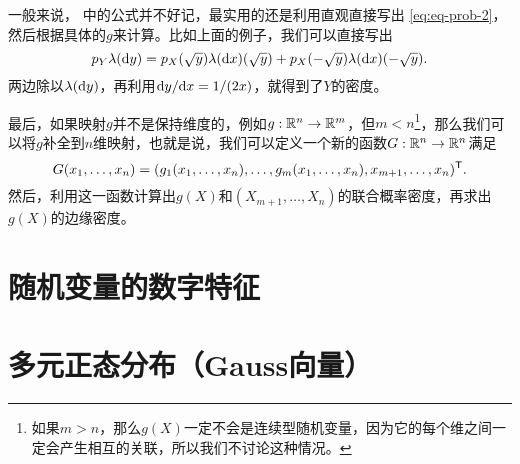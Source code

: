 一般来说， 中的公式并不好记，最实用的还是利用直观直接写出 \eqref{eq:eq-prob-2}，然后根据具体的$g$来计算。比如上面的例子，我们可以直接写出
\[p_Y\lambda(\mathrm{d} y)=p_X(\sqrt{y})\lambda(\mathrm{d} x)(\sqrt{y})+p_X(-\sqrt{y})\lambda(\mathrm{d} x)(-\sqrt{y}).\]
两边除以$\lambda(\mathrm{d} y)$，再利用$\mathrm{d} y/\mathrm{d} x=1/(2x)$，就得到了$Y$的密度。

最后，如果映射$g$并不是保持维度的，例如$g:\mathbb{R}^n\to\mathbb{R}^m$，但$m<n$\footnote{如果$m>n$，那么$g(X)$一定不会是连续型随机变量，因为它的每个维之间一定会产生相互的关联，所以我们不讨论这种情况。}，那么我们可以将$g$补全到$n$维映射，也就是说，我们可以定义一个新的函数$G:\mathbb{R}^n\to\mathbb{R}^n$满足
\[G(x_1,\dots,x_n)=(g_1(x_1,\dots,x_n),\dots,g_m(x_1,\dots,x_n),x_{m+1},\dots,x_n)^{\mathsf{T}}.\]
然后，利用这一函数计算出$g(X)$和$(X_{m+1},\dots,X_n)$的联合概率密度，再求出$g(X)$的边缘密度。

\section{随机变量的数字特征}\label{sec:expectation}

\section{多元正态分布（Gauss向量）}\label{sec:multivariate-normal}

\endgroup